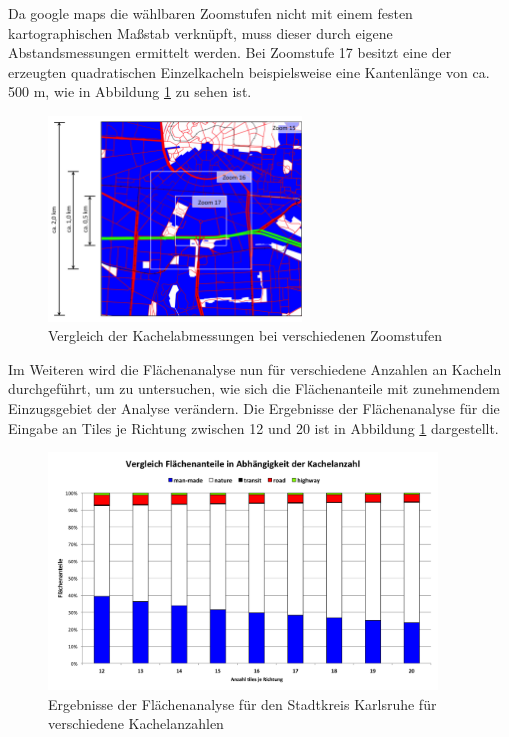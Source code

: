 %
Da google maps die wählbaren Zoomstufen nicht mit einem festen kartographischen Maßstab verknüpft, muss dieser durch eigene Abstandsmessungen ermittelt werden. Bei Zoomstufe 17 besitzt eine der erzeugten quadratischen Einzelkacheln beispielsweise eine Kantenlänge von ca. \num{500} \si{\metre}, wie in Abbildung \ref{fig:Zoomvgl} zu sehen ist.\\
%
\begin{figure}
  \centering
    \includegraphics[width=0.6\textwidth]{images/3_Zoomvergleich_KA.png}
    \caption{Vergleich der Kachelabmessungen bei verschiedenen Zoomstufen}
    \label{fig:Zoomvgl}
\end{figure}
%
Im Weiteren wird die Flächenanalyse nun für verschiedene Anzahlen an Kacheln durchgeführt, um zu untersuchen, wie sich die Flächenanteile mit zunehmendem Einzugsgebiet der Analyse verändern. Die Ergebnisse der Flächenanalyse für die Eingabe an Tiles je Richtung zwischen 12 und 20 ist in Abbildung \ref{fig:Zoomvgl} dargestellt.\\
%
\newline
\begin{figure}
  \centering
    \includegraphics[width=0.92\textwidth]{images/3_Kachelvergleich_KA.png}
    \caption{Ergebnisse der Flächenanalyse für den Stadtkreis Karlsruhe für verschiedene Kachelanzahlen}
    \label{fig:Kachel_vgl}
\end{figure}
